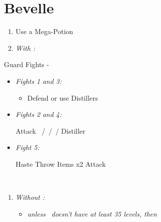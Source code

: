\chapter{Bevelle}\label{ch:bevelle}

\begin{enumerate}
	\item Use a Mega-Potion
	\item \textit{With \sleepingpowder{}:}
\end{enumerate}
\begin{battle}{Guard Fights - \sleepingpowder}
	\begin{itemize}
		\item \textit{Fights 1 and 3:}
		      \begin{itemize}
			      \tidusf Attack
			      \item Defend or use Distillers
		      \end{itemize}
		\item \textit{Fights 2 and 4:}
		      \begin{itemize}
			      \tidusf Attack
			      \rikkuf \sleepingpowder
			      \kimahrif \bombcore\ /\silencegrenade\ /\smokebomb\ / Distiller\
		      \end{itemize}
		\item \textit{Fight 5:}
		      \begin{itemize}
			      \tidusf Haste \rikku
			      \rikkuf Throw Items x2
			      \tidusf Attack
		      \end{itemize}
	\end{itemize}
\end{battle}
\bothvfill
\lossvfill
\winvfill
\ 
\bothcb
\wincb
\losscb
\ 
\ \bothnewline \winnewline \lossnewline
\begin{enumerate}[resume]
	\item \textit{Without \sleepingpowder{}:}
	      \begin{itemize}
		      \item \formation{\tidus}{\rikku}{\auron} \textit{unless \lulu\ doesn't have at least 35 levels, then } \formation{\tidus}{\rikku}{\lulu}
	      \end{itemize}
\end{enumerate}
